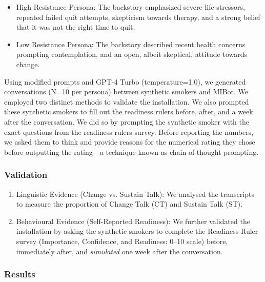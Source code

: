 \begin{itemize}
	\item High Resistance Persona: The backstory emphasized severe life stressors, repeated failed quit attempts, skepticism towards therapy, and a strong belief that it was not the right time to quit.
	\item Low Resistance Persona: The backstory described recent health concerns prompting contemplation, and an open, albeit skeptical, attitude towards change.
\end{itemize}

Using modified prompts and GPT-4 Turbo (temperature=1.0), we generated conversations (N=10 per persona) between synthetic smokers and MIBot. We employed two distinct methods to validate the installation. We also prompted these synthetic smokers to fill out the readiness rulers before, after, and a week after the conversation. We did so by prompting the synthetic smoker with the exact questions from the readiness rulers survey. Before reporting the numbers, we asked them to think and provide reasons for the numerical rating they chose before outputting the rating---a technique known as chain-of-thought prompting.

\subsubsection{Validation}

\begin{enumerate}
	\item Linguistic Evidence (Change vs. Sustain Talk): We analysed the transcripts to measure the proportion of Change Talk (CT) and Sustain Talk (ST).


	\item Behavioural Evidence (Self-Reported Readiness): We further validated the installation by asking the synthetic smokers to complete the Readiness Ruler survey (Importance, Confidence, and Readiness; 0--10 scale) before, immediately after, and \emph{simulated} one week after the conversation.

\end{enumerate}






\subsubsection{Results}




